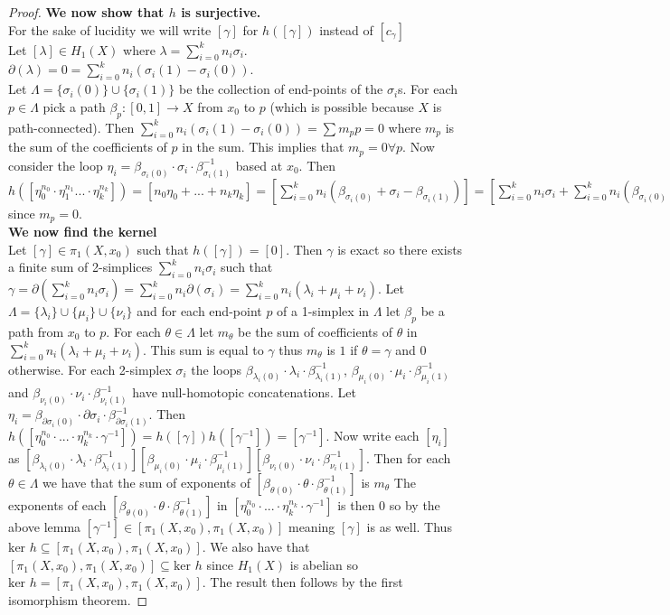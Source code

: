 \documentclass{report}
\begin{document}
\begin{proof}
\noindent \textbf{We now show that $h$ is surjective.}\\
For the sake of lucidity we will write $[\gamma]$ for $h([\gamma])$ instead of $[c_\gamma]$\\
Let $[\lambda]\in H_1(X)$ where $\lambda=\sum_{i=0}^k n_i\sigma_i$.
$\partial (\lambda)=0=\sum_{i=0}^k n_i(\sigma_i(1)-\sigma_i(0))$.\\
Let $\Lambda=\{\sigma_i(0)\}\cup\{\sigma_i(1)\}$ be the collection of end-points of the $\sigma_i$s.
For each $p\in\Lambda$ pick a path $\beta_p\colon [0,1]\to X$ from $x_0$ to $p$ (which is possible because $X$ is path-connected). Then $\sum_{i=0}^k n_i(\sigma_i(1)-\sigma_i(0))=\sum m_pp=0$ where $m_p$ is the sum of the coefficients of $p$ in the sum. This implies that $m_p=0 \forall p$. Now consider the loop $\eta_i=\beta_{\sigma_i(0)}\cdot\sigma_i\cdot\beta_{\sigma_i(1)}^{-1}$ based at $x_0$. Then $h([\eta_0^{n_0}\cdot\eta_1^{n_1}...\cdot\eta_k^{n_k}])=[n_0\eta_0+...+n_k\eta_k]=[\sum_{i=0}^kn_i(\beta_{\sigma_i(0)}+\sigma_i-\beta_{\sigma_i(1)})]=[\sum_{i=0}^kn_i\sigma_i+\sum_{i=0}^kn_i(\beta_{\sigma_i(0)}-\beta_{\sigma_i(1)})]=[\sum_{i=0}^kn_i\sigma_i-\sum m_p\beta_p]=[\sum_{i=0}^kn_i\sigma_i]=[\lambda]$ since $m_p=0$.\\
\noindent\textbf{We now find the kernel}\\
Let $[\gamma]\in\pi_1(X,x_0)$ such that $h([\gamma])=[0]$.
Then $\gamma$ is exact so there exists a finite sum of 2-simplices $\sum_{i=0}^kn_i\sigma_i$ such that $\gamma=\partial(\sum_{i=0}^kn_i\sigma_i)=\sum_{i=0}^kn_i\partial(\sigma_i)=\sum_{i=0}^kn_i(\lambda_i+\mu_i+\nu_i)$. Let $\Lambda=\{\lambda_i\}\cup\{\mu_i\}\cup\{\nu_i\}$ and for each end-point $p$ of a 1-simplex in $\Lambda$ let $\beta_p$ be a path from $x_0$ to $p$. For each $\theta\in\Lambda$ let $m_\theta$ be the sum of coefficients of $\theta$ in $\sum_{i=0}^kn_i(\lambda_i+\mu_i+\nu_i)$. This sum is equal to $\gamma$ thus $m_\theta$ is $1$ if $\theta=\gamma$ and $0$ otherwise. For each 2-simplex $\sigma_i$ the loops $\beta_{\lambda_i(0)}\cdot\lambda_i\cdot\beta_{\lambda_i(1)}^{-1}$, $\beta_{\mu_i(0)}\cdot\mu_i\cdot\beta_{\mu_i(1)}^{-1}$ and $\beta_{\nu_i(0)}\cdot\nu_i\cdot\beta_{\nu_i(1)}^{-1}$ have null-homotopic concatenations. Let $\eta_i=\beta_{\partial\sigma_i(0)}\cdot\partial\sigma_i\cdot\beta_{\partial\sigma_i(1)}^{-1}$. Then $h([\eta_0^{n_0}\cdot...\cdot\eta_k^{n_k}\cdot\gamma^{-1}])=h([\gamma])h([\gamma^{-1}])=[\gamma^{-1}]$. Now write each $[\eta_i]$ as $[\beta_{\lambda_i(0)}\cdot\lambda_i\cdot\beta_{\lambda_i(1)}^{-1}][\beta_{\mu_i(0)}\cdot\mu_i\cdot\beta_{\mu_i(1)}^{-1}][\beta_{\nu_i(0)}\cdot\nu_i\cdot\beta_{\nu_i(1)}^{-1}]$. Then for each $\theta\in\Lambda$ we have that the sum of exponents of $[\beta_{\theta(0)}\cdot\theta\cdot\beta_{\theta(1)}^{-1}]$ is $m_\theta$ The exponents of each $[\beta_{\theta(0)}\cdot\theta\cdot\beta_{\theta(1)}^{-1}]$ in $[\eta_0^{n_0}\cdot...\cdot\eta_k^{n_k}\cdot\gamma^{-1}]$ is then 0 so by the above lemma $[\gamma^{-1}]\in[\pi_1(X,x_0),\pi_1(X,x_0)]$ meaning $[\gamma]$ is as well. Thus $\text{ker }h\subseteq [\pi_1(X,x_0),\pi_1(X,x_0)]$. We also have that $[\pi_1(X,x_0),\pi_1(X,x_0)]\subseteq \text{ker }h$ since $H_1(X)$ is abelian so $\text{ker }h=[\pi_1(X,x_0),\pi_1(X,x_0)]$. The result then follows by the first isomorphism theorem.

\end{proof}
\end{document}
